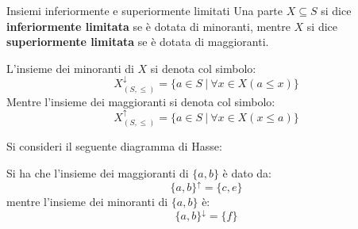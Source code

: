 \begin{defbox}{Insiemi inferiormente e superiormente limitati}
	Una parte $X\subseteq S$ si dice \textbf{inferiormente limitata} se è dotata di minoranti, mentre $X$ si dice \textbf{superiormente limitata} se è dotata di maggioranti.
\end{defbox} 

L'insieme dei minoranti di $X$ si denota col simbolo:
\begin{equation}
	X^{\downarrow}_{(S,\leq)}=\{a \in S \ | \ \forall x \in X (a \leq x)\}
\end{equation}
Mentre l'insieme dei maggioranti si denota col simbolo:
\begin{equation}
	X^{\uparrow}_{(S,\leq)}=\{a \in S \ | \ \forall x \in X (x \leq a)\}
\end{equation}


\begin{example}
	Si consideri il seguente diagramma di Hasse:
	\begin{center}
	\end{center}
	Si ha che l'insieme dei maggioranti di $\{a,b\}$ è dato da:
	\begin{displaymath}
		\{a,b\}^{\uparrow} =\{c,e\}
	\end{displaymath}
	mentre l'insieme dei minoranti di $\{a,b\}$ è:
	\begin{displaymath}
		\{a,b\}^{\downarrow} = \{f\}
	\end{displaymath}
\end{example}

